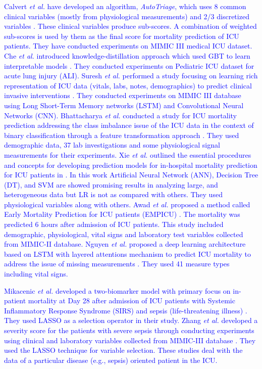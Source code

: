 \textcolor{blue}{Calvert \textit{et al.} have developed an algorithm, \textit{AutoTriage}, which uses 8 common clinical variables (mostly from physiological measurements) and 2/3 discretized variables \cite{Calvert2016}. These clinical variables produce sub-scores. A combination of weighted sub-scores is used by them as the final score for mortality prediction of ICU patients. They have conducted experiments on MIMIC III medical ICU dataset. Che \textit{et al.} introduced knowledge-distillation approach which used GBT to learn interpretable models \cite{ZhengpingChe2016}. They conducted experiments on Pediatric ICU dataset for acute lung injury (ALI). Suresh \textit{et al.} performed a study focusing on learning rich representation of ICU data (vitals, labs, notes, demographics) to predict clinical invasive interventions \cite{Suresh2017}. They conducted experiments on MIMIC III database using Long Short-Term Memory networks (LSTM) and Convolutional Neural Networks (CNN). Bhattacharya \textit{et al.} conducted a study for ICU mortality prediction addressing the class imbalance issue of the ICU data in the context of binary classification through a feature transformation approach \cite{Bhattacharya2017}. They used demographic data, 37 lab investigations and some physiological signal measurements for their experiments. Xie \textit{et al.} outlined the essential procedures and concepts for developing prediction models for in-hospital mortality prediction for ICU patients in \cite{Xie2017}. In this work Artificial Neural Network (ANN), Decision Tree (DT), and SVM are showed promising results in analyzing large, and heterogeneous data but LR is not as compared with others. They used physiological variables along with others. Awad \textit{et al.} proposed a method called Early Mortality Prediction for ICU patients (EMPICU) \cite{Awad2017}. The mortality was predicted 6 hours after admission of ICU patients. This study included demographic, physiological, vital signs and laboratory test variables collected from MIMIC-II database. Nguyen \textit{et al.} proposed a deep learning architecture based on LSTM with layered attentions mechanism to predict ICU mortality to address the issue of missing measurements \cite{Nguyen2017}. They used 41 measure types including vital signs.} 

\textcolor{blue}{Mikacenic \textit{et al.} developed a two-biomarker model with primary focus on in-patient mortality at Day 28 after admission of ICU patients with Systemic Inflammatory Response Syndrome (SIRS) and sepsis (life-threatening illness) \cite{Mikacenic2017}. They used LASSO as a selection operator in their study. Zhang \textit{et al.} developed a severity score for the patients with severe sepsis through conducting experiments using clinical and laboratory variables collected from MIMIC-III database \cite{Zhang2017}. They used the LASSO technique for variable selection. These studies deal with the data of a particular disease (e.g., sepsis) oriented patient in the ICU.} 

